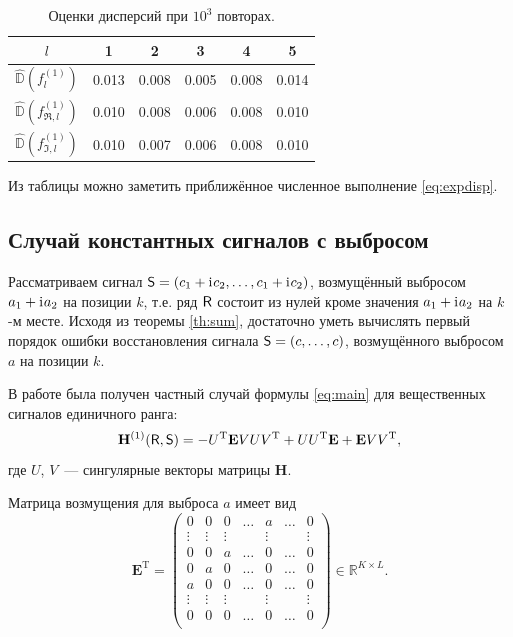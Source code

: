 \documentclass[specialist,
               substylefile = spbu.rtx,
               subf,href,colorlinks=true, 12pt]{disser}
\begin{document}
\begin{table}[H]
	\begin{center}
		\caption{Оценки дисперсий при $10^3$ повторах.}
		\label{tab:pi_div_2}
		\begin{tabular}{|c|c|c|c|c|c|}
			\hline
			$l$	& 1 & 2 & 3 & 4 & 5\\
			\hline
			$\hat{\mathbb{D}}(f^{(1)}_l)$ & 0.013  & 0.008  & 0.005 & 0.008 & 0.014\\
			\hline
			$\hat{\mathbb{D}}(f^{(1)}_{\Re, l})$	& 0.010 & 0.008 & 0.006 & 0.008 & 0.010\\
			\hline
			$\hat{\mathbb{D}}(f^{(1)}_{\Im, l})$ & 0.010  & 0.007  & 0.006 & 0.008 & 0.010\\
			\hline
		\end{tabular}
	\end{center}
\end{table}

Из таблицы можно заметить приближённое численное выполнение \eqref{eq:expdisp}.

\subsection{Случай константных сигналов с выбросом}
Рассматриваем сигнал $\textsf{S} = (c_1 + \mathrm{i}\mkern1mu c_2, \ldots, c_1 + \mathrm{i}\mkern1mu c_2)$, возмущённый выбросом $a_1 + \mathrm{i}\mkern1mu a_2$ на позиции $k$, т.е. ряд $\textsf{R}$ состоит из нулей кроме значения $a_1 + \mathrm{i}\mkern1mu a_2$ на $k$-м месте. Исходя из теоремы \ref{th:sum}, достаточно уметь вычислять первый порядок ошибки восстановления сигнала $\textsf{S} = (c, \ldots, c)$, возмущённого выбросом $a$ на позиции $k$.

В работе \cite{Nekr2008} была получен частный случай формулы \eqref{eq:main} для вещественных сигналов единичного ранга:
\begin{equation} \label{eq:real_rk1}
\mathbf{H}^{(1)}(\textsf{R}, \textsf{S}) = -U^{\mathrm{T}} \mathbf{E} V U V^{\mathrm{T}} + U U^{\mathrm{T}} \mathbf{E} + \mathbf{E} V V^{\mathrm{T}},
\end{equation}
где $U$, $V$~--- сингулярные векторы матрицы $\mathbf{H}$.

Матрица возмущения для выброса $a$ имеет вид
$$\mathbf{E}^{\mathrm{T}} = \begin{pmatrix}
	0 & 0 & 0 & \ldots &  a  & \ldots & 0\\
	 \vdots &\vdots & \vdots & &  \vdots & & \vdots\\
	0 & 0 & a & \ldots & 0 & \ldots & 0\\
	0 & a & 0 & \ldots & 0 & \ldots & 0\\
	a & 0 & 0 & \ldots & 0 & \ldots & 0\\
	\vdots &\vdots & \vdots & & \vdots & & \vdots\\
	0 & 0 & 0 & \ldots & 0 & \ldots & 0\\
\end{pmatrix} \in \mathbb{R}^{K \times L}.$$
\end{document}
